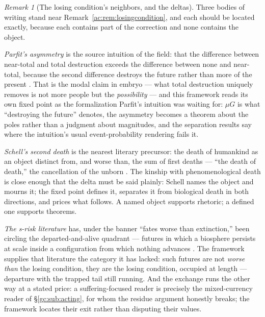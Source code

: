 \documentclass[11pt]{article}
\numberwithin{equation}{section}
\theoremstyle{plain}
\theoremstyle{definition}
\theoremstyle{remark}
\newtheorem{remark}[theorem]{Remark}
\begin{document}
\begin{remark}[The losing condition's neighbors, and the deltas]
\label{ac:rem:losingneighbors}
Three bodies of writing stand near Remark~\ref{ac:rem:losingcondition},
and each should be located exactly, because each contains part of the
correction and none contains the object.

\emph{Parfit's asymmetry} is the source intuition of the field: that
the difference between near-total and total destruction exceeds the
difference between none and near-total, because the second difference
destroys the future rather than more of the present \cite{Parfit84}.
That is the modal claim in embryo --- what total destruction uniquely
removes is not more people but the \emph{possibility} --- and this
framework reads its own fixed point as the formalization Parfit's
intuition was waiting for: $\mu G$ is what ``destroying the future''
denotes, the asymmetry becomes a theorem about the poles rather than a
judgment about magnitudes, and the separation results say where the
intuition's usual event-probability rendering fails it.

\emph{Schell's second death} is the nearest literary precursor: the
death of humankind as an object distinct from, and worse than, the sum
of first deaths --- ``the death of death,'' the cancellation of the
unborn \cite{Schell82}. The kinship with phenomenological death is
close enough that the delta must be said plainly: Schell names the
object and mourns it; the fixed point defines it, separates it from
biological death in both directions, and prices what follows. A named
object supports rhetoric; a defined one supports theorems.

\emph{The s-risk literature} has, under the banner ``fates worse than
extinction,'' been circling the departed-and-alive quadrant --- futures
in which a biosphere persists at scale inside a configuration from
which nothing advances \cite{AG16}. The framework supplies that
literature the category it has lacked: such futures are not
\emph{worse than} the losing condition, they are the losing condition,
occupied at length --- departure with the trapped tail still running.
And the exchange runs the other way at a stated price: a
suffering-focused reader is precisely the mixed-currency reader of
\S\ref{gc:sub:acting}, for whom the residue argument honestly breaks;
the framework locates their exit rather than disputing their values.
\end{remark}
\end{document}

